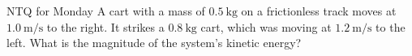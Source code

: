 \documentclass[english]{beamer}
\begin{document}
\begin{frame}{NTQ for Monday}
  A cart with a mass of $\SI{0.5}{\kilogram}$ on a frictionless track moves at $\SI{1.0}{\meter\per\second}$ to the right. It strikes a $\SI{0.8}{\kilogram}$ cart, which was moving at $\SI{1.2}{\meter\per\second}$ to the left. What is the magnitude of the system's kinetic energy?
\end{frame}
\end{document}
